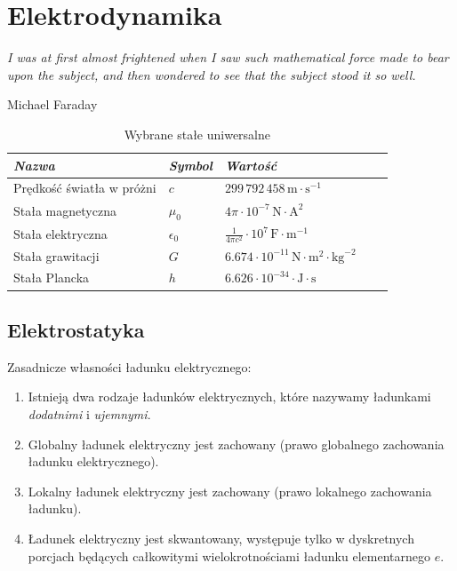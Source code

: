 \documentclass[../main.tex]{subfiles}
\begin{document}
\section{Elektrodynamika}
\textit{I was at first almost frightened when I saw such mathematical force made to bear upon the
subject, and then wondered to see that the subject stood it so well.} \begin{flushright}Michael
Faraday
\end{flushright}
\begin{table}[h]
    \centering
    \begin{tabular}{ *5l }    \toprule \emph{Nazwa} & \emph{Symbol} & \emph{Wartość}  \\\midrule
    Prędkość światła w próżni    & \(c\)  & \(299\,792\,458\,\text{m}\cdot\text{s}^{-1}\)   \\ 
    Stała magnetyczna  & \(\mu_0\) & \(4\pi\cdot 10^{-7}\,\text{N}\cdot\text{A}^2\)  \\ 
    Stała elektryczna  & \(\epsilon_0\) & \(\frac{1}{4\pi c^2}\cdot
    10^{7}\,\text{F}\cdot\text{m}^{-1}\)  \\
    Stała grawitacji     & \(G\)  & \(6.674\cdot
    10^{-11}\,\text{N}\cdot\text{m}^2\cdot\text{kg}^{-2}\)   \\ 
    Stała Plancka  & \(h\) & \(6.626\cdot 10^{-34}\cdot \text{J}\cdot\text{s}\)\\ 
    \bottomrule
    \hline
\end{tabular}
\caption{Wybrane stałe uniwersalne}
\end{table}


\subsection{Elektrostatyka}
Zasadnicze własności ładunku elektrycznego:
\begin{enumerate}
    \item Istnieją dwa rodzaje ładunków elektrycznych, które nazywamy ładunkami \textit{dodatnimi} i
    \textit{ujemnymi}.
    \item Globalny ładunek elektryczny jest zachowany (prawo globalnego zachowania ładunku
    elektrycznego).
    \item Lokalny ładunek elektryczny jest zachowany (prawo lokalnego zachowania ładunku).
    \item Ładunek elektryczny jest skwantowany, występuje tylko w dyskretnych porcjach będących
    całkowitymi wielokrotnościami ładunku elementarnego \(e\).
\end{enumerate}
\end{document}

